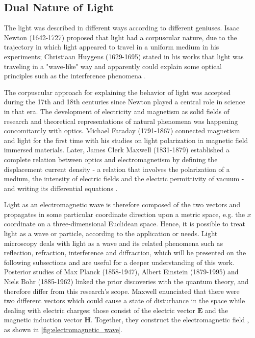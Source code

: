 \subsection{Dual Nature of Light}

The light was described in different ways according to different geniuses. Isaac Newton (1642-1727) proposed that light had a corpuscular nature, due to the trajectory in which light appeared to travel in a uniform medium in his experiments; Christiaan Huygens (1629-1695) stated in his works that light was traveling in a "wave-like" way and apparently could explain some optical principles such as the interference phenomena \cite{fowles1989introduction}. 

The corpuscular approach for explaining the behavior of light was accepted during the 17th and 18th centuries since Newton played a central role in science in that era. The development of electricity and magnetism as solid fields of research and theoretical representations of natural phenomena was happening concomitantly with optics. Michael Faraday (1791-1867) connected magnetism and light for the first time with his studies on light polarization in magnetic field immersed materials. Later, James Clerk Maxwell (1831-1879) established a complete relation between optics and electromagnetism by defining the displacement current density - a relation that involves the polarization of a medium, the intensity of electric fields and the electric permittivity of vacuum - and writing its differential equations \cite{zilio2009optica}.

Light as an electromagnetic wave is therefore composed of the two vectors and propagates in some particular coordinate direction upon a metric space, e.g. the $\mathit{x}$ coordinate on a three-dimensional Euclidean space. Hence, it is possible to treat light as a wave or particle, according to the application or needs. Light microscopy deals with light as a wave and its related phenomena such as reflection, refraction, interference and diffraction, which will be presented on the following subsections and are useful for a deeper understanding of this work. Posterior studies of Max Planck (1858-1947), Albert Einstein (1879-1995) and Niels Bohr (1885-1962) \cite{fowles1989introduction} linked the prior discoveries with the quantum theory, and therefore differ from this research's scope. Maxwell enunciated that there were two different vectors which could cause a state of disturbance in the space while dealing with electric charges; those consist of the electric vector $\mathit{\mathbf{E}}$ and the magnetic induction vector $\mathit{\mathbf{H}}$. Together, they construct the electromagnetic field \cite{born1999principles}, as shown in \autoref{fig:electromagnetic_wave}.

